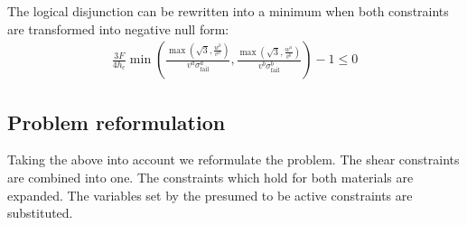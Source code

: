 The logical disjunction can be rewritten into a minimum when both constraints are transformed into negative null form:
\begin{align*}
	\frac{3 F}{4 h_\text{c}}  \min{\left( \frac{ \max{\left( \sqrt{3}, \frac{w^b}{v^a} \right)} }{ v^a \sigma^a_\text{fail} }  
		, \frac{ \max{\left( \sqrt{3}, \frac{w^a}{v^b} \right)} }{ v^b \sigma^b_\text{fail} }   \right)} - 1 \le 0  
\end{align*}

\subsection{Problem reformulation}
Taking the above into account we reformulate the problem.
The shear constraints are combined into one.
The constraints which hold for both materials are expanded.
The variables set by the presumed to be active constraints are substituted.

